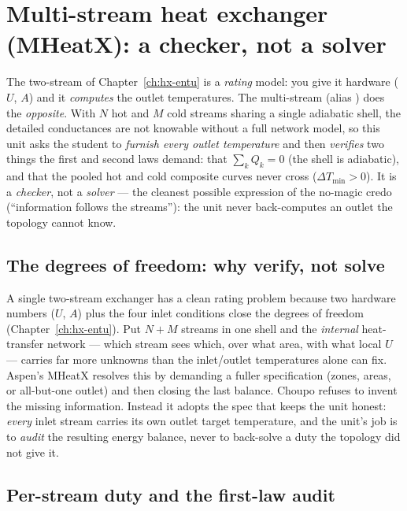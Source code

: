 \documentclass[11pt,a4paper]{article}
\begin{document}
\section{Multi-stream heat exchanger (MHeatX): a checker, not a
solver}\label{ch:mheatx}

\begin{whatyoulllearn}
The two-stream  of Chapter~\ref{ch:hx-entu} is a
\emph{rating} model: you give it hardware ($U$, $A$) and it
\emph{computes} the outlet temperatures.  The multi-stream
 (alias ) does the \emph{opposite}.
With $N$ hot and $M$ cold streams sharing a single adiabatic shell, the
detailed conductances are not knowable without a full network model, so
this unit asks the student to \emph{furnish every outlet temperature}
and then \emph{verifies} two things the first and second laws demand:
that $\sum_k Q_k = 0$ (the shell is adiabatic), and that the pooled hot
and cold composite curves never cross ($\Delta T_{\min} > 0$).  It is a
\emph{checker}, not a \emph{solver} --- the cleanest possible expression
of the no-magic credo (``information follows the streams''): the
unit never back-computes an outlet the topology cannot know.
\end{whatyoulllearn}

\subsection{The degrees of freedom: why verify, not solve}

A single two-stream exchanger has a clean rating problem because two
hardware numbers ($U$, $A$) plus the four inlet conditions close the
degrees of freedom (Chapter~\ref{ch:hx-entu}).  Put $N+M$ streams in one
shell and the \emph{internal} heat-transfer network --- which stream
sees which, over what area, with what local $U$ --- carries far more
unknowns than the inlet/outlet temperatures alone can fix.  Aspen's
MHeatX resolves this by demanding a fuller specification (zones, areas,
or all-but-one outlet) and then closing the last balance.  Choupo
refuses to invent the missing information.  Instead it adopts the spec
that keeps the unit honest: \emph{every} inlet stream carries its own
outlet target temperature, and the unit's job is to \emph{audit} the
resulting energy balance, never to back-solve a duty the topology did not
give it.

\subsection{Per-stream duty and the first-law audit}
\end{document}
